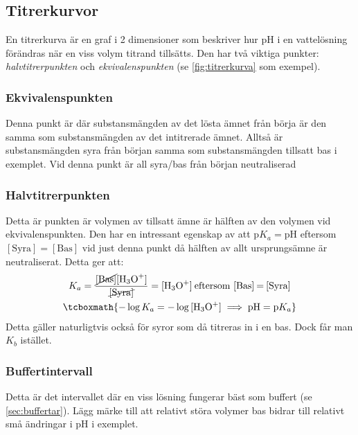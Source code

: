 \subsection{Titrerkurvor}
\begin{figure*}[h]
    \centering
    \caption{Titrerkurva}
    \label{fig:titrerkurva}
\end{figure*}
En titrerkurva är en graf i 2 dimensioner som beskriver hur pH i en vattelösning förändras när en viss volym titrand tillsätts. Den har två viktiga punkter: \emph{halvtitrerpunkten} och \emph{ekvivalenspunkten} (se \cref{fig:titrerkurva} som exempel).
\subsubsection*{Ekvivalenspunkten}
Denna punkt är där substansmängden av det lösta ämnet från börja är den samma som substansmängden av det intitrerade ämnet. Alltså är substansmängden syra från början samma som substansmängden tillsatt bas i exemplet. Vid denna punkt är all syra/bas från början neutraliserad

\subsubsection*{Halvtitrerpunkten}
Detta är punkten är volymen av tillsatt ämne är hälften av den volymen vid ekvivalenspunkten. Den har en intressant egenskap av att $\mathrm{p}K_{a} = \mathrm{pH}$
eftersom $[\mathrm{Syra}] = [\mathrm{Bas}]$ vid just denna punkt då hälften av allt ursprungsämne är neutraliserat. Detta ger att:
\begin{gather*}
    K_a = \ce{\frac{\cancel{[\mathrm{Bas}]}[H3O+]}{\cancel{[\mathrm{Syra}]}}} = \ce{[H3O+]}\: \text{eftersom } \ce{[Bas] = [Syra]} \\
    \tcboxmath{-\log{K_a} = -\log{[\mathrm{H_3O^+}]} \implies \mathrm{pH} = \mathrm{p}K_a}
\end{gather*}
Detta gäller naturligtvis också för syror som då titreras in i en bas. Dock får man $K_b$ istället.

\subsubsection*{Buffertintervall}
Detta är det intervallet där en viss lösning fungerar bäst som buffert (se \vref{sec:buffertar}). Lägg märke till att relativt störa volymer bas bidrar till relativt små ändringar i pH i exemplet.